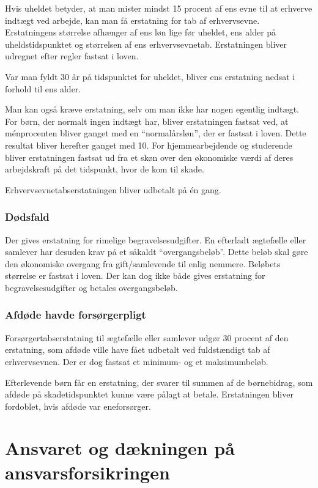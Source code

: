 \documentclass[]{book}
\begin{document}
Hvis uheldet betyder, at man mister mindst 15 procent af ens evne til at erhverve indtægt ved arbejde, kan man få erstatning for tab af erhvervsevne. Erstatningens størrelse afhænger af ens løn lige før uheldet, ens alder på uheldstidspunktet og størrelsen af ens erhvervsevnetab. Erstatningen bliver udregnet efter regler fastsat i loven.

Var man fyldt 30 år på tidspunktet for uheldet, bliver ens erstatning nedsat i forhold til ens alder.

Man kan også kræve erstatning, selv om man ikke har nogen egentlig indtægt. For børn, der normalt ingen indtægt har, bliver erstatningen fastsat ved, at ménprocenten bliver ganget med en ``normalårsløn'', der er fastsat i loven. Dette resultat bliver herefter ganget med 10. For hjemmearbejdende og studerende bliver erstatningen fastsat ud fra et skøn over den økonomiske værdi af deres arbejdskraft på det tidspunkt, hvor de kom til skade.

Erhvervsevnetabserstatningen bliver udbetalt på én gang.

\hypertarget{ddsfald}{%
\subsubsection{Dødsfald}\label{ddsfald}}

Der gives erstatning for rimelige begravelsesudgifter. En efterladt ægtefælle eller samlever har desuden krav på et såkaldt ``overgangsbeløb''. Dette beløb skal gøre den økonomiske overgang fra gift/samlevende til enlig nemmere. Beløbets størrelse er fastsat i loven. Der kan dog ikke både gives erstatning for begravelsesudgifter og betales overgangsbeløb.

\hypertarget{afdde-havde-forsrgerpligt}{%
\subsubsection{Afdøde havde forsørgerpligt}\label{afdde-havde-forsrgerpligt}}

Forsørgertabserstatning til ægtefælle eller samlever udgør 30 procent af den erstatning, som afdøde ville have fået udbetalt ved fuldstændigt tab af erhvervsevnen. Der er dog fastsat et minimum- og et maksimumbeløb.

Efterlevende børn får en erstatning, der svarer til summen af de børnebidrag, som afdøde på skadetidspunktet kunne være pålagt at betale. Erstatningen bliver fordoblet, hvis afdøde var eneforsørger.

\hypertarget{ansvaret-og-dkningen-pa-ansvarsforsikringen}{%
\section{Ansvaret og dækningen på ansvarsforsikringen}\label{ansvaret-og-dkningen-pa-ansvarsforsikringen}}
\end{document}
